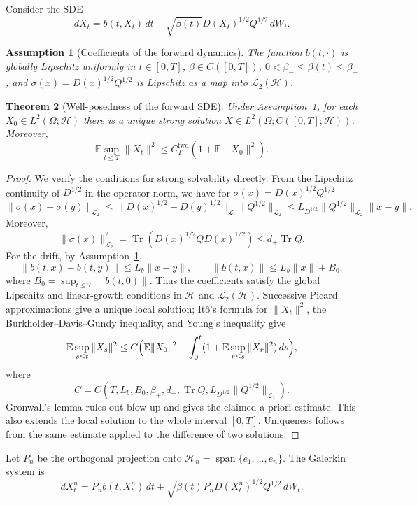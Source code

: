 \documentclass{article}
\newtheorem{theorem}{Theorem}[section]
\newtheorem{assumption}[theorem]{Assumption}
\newcommand{\Hh}{\mathcal H}
\newcommand{\LL}{\mathcal L}
\newcommand{\LLtwo}{\mathcal L_2}
\newcommand{\E}{\mathbb E}
\newcommand{\Tr}{\operatorname{Tr}}
\begin{document}
Consider the SDE
\[
        dX_t=b(t,X_t)\,dt+\sqrt{\beta(t)}D(X_t)^{1/2}Q^{1/2}\,dW_t .
\]

\begin{assumption}[Coefficients of the forward dynamics]
\label{ass:forward}
The function \(b(t,\cdot)\) is globally Lipschitz uniformly in \(t\in[0,T]\),
\(\beta\in C([0,T])\), \(0<\beta_-\le\beta(t)\le\beta_+\), and
\(\sigma(x)=D(x)^{1/2}Q^{1/2}\) is Lipschitz as a map into
\(\LLtwo(\Hh)\).
\end{assumption}

\begin{theorem}[Well-posedness of the forward SDE]
\label{thm:forward}
Under Assumption~\ref{ass:forward}, for each
\(X_0\in L^2(\Omega;\Hh)\) there is a unique strong solution
\(X\in L^2(\Omega;C([0,T];\Hh))\). Moreover,
\[
        \E\sup_{t\le T}\|X_t\|^2
        \le C_T^{\mathrm{fwd}}(1+\E\|X_0\|^2).
\]
\end{theorem}

\begin{proof}
We verify the conditions for strong solvability directly. From the Lipschitz
continuity of \(D^{1/2}\) in the operator norm, we have for
\(\sigma(x)=D(x)^{1/2}Q^{1/2}\)
\[
        \|\sigma(x)-\sigma(y)\|_{\LLtwo}
        \le
        \|D(x)^{1/2}-D(y)^{1/2}\|_{\LL}\|Q^{1/2}\|_{\LLtwo}
        \le L_{D^{1/2}}\|Q^{1/2}\|_{\LLtwo}\|x-y\|.
\]
Moreover,
\[
        \|\sigma(x)\|_{\LLtwo}^2
        =\Tr(D(x)^{1/2}QD(x)^{1/2})
        \le d_+\Tr Q.
\]
For the drift, by Assumption~\ref{ass:forward},
\[
        \|b(t,x)-b(t,y)\|\le L_b\|x-y\|,
        \qquad
        \|b(t,x)\|\le L_b\|x\|+B_0,
\]
where \(B_0=\sup_{t\le T}\|b(t,0)\|\). Thus the coefficients satisfy the
global Lipschitz and linear-growth conditions in \(\Hh\) and
\(\LLtwo(\Hh)\). Successive Picard approximations give a unique local
solution; It\^o's formula for \(\|X_t\|^2\), the
Burkholder--Davis--Gundy inequality, and Young's inequality give
\[
        \E\sup_{s\le t}\|X_s\|^2
        \le
        C\Bigl(\E\|X_0\|^2+
        \int_0^t(1+\E\sup_{r\le s}\|X_r\|^2)\,ds\Bigr),
\]
where
\[
        C=C(T,L_b,B_0,\beta_+,d_+,\Tr Q,L_{D^{1/2}}\|Q^{1/2}\|_{\LLtwo}).
\]
Gronwall's lemma rules out blow-up and gives the claimed a priori estimate.
This also extends the local solution to the whole interval \([0,T]\).
Uniqueness follows from the same estimate applied to the difference of two
solutions.
\end{proof}

Let \(P_n\) be the orthogonal projection onto
\(\Hh_n=\operatorname{span}\{e_1,\dots,e_n\}\). The Galerkin system is
\[
        dX_t^n=P_nb(t,X_t^n)\,dt+
        \sqrt{\beta(t)}P_nD(X_t^n)^{1/2}Q^{1/2}\,dW_t.
\]
\end{document}
